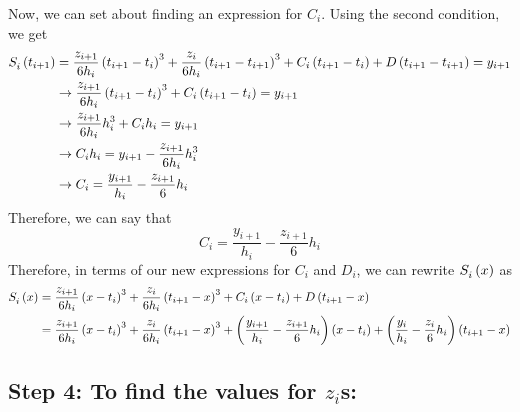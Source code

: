 \documentclass[letterpaper, 10pt, titlepage]{article}
\newcommand{\pp}{\paren}
\newcommand{\primed}[1]{^{
    \ifthenelse
    {
        \equal{#1}{0}
    }
    {
    }
    {
        \foreach \x in {1,...,#1}{\prime}}
    }
}
\newcommand{\fs}[3]{\functionof{S_{#1}\primed{#2}}{#3}}
\begin{document}
Now, we can set about finding an expression for $C_i$. Using the second
condition, we get
\begin{equation}
    \begin{aligned}
        \fs{i}{0}{t_{i+1}}
        &=
        \dfrac{z_{i+1}}{6h_i}\pp{t_{i+1} - t_i}^3
        + \dfrac{z_{i}}{6h_i}\pp{t_{i+1} - t_{i+1}}^3 + C_i\pp{t_{i+1} - t_i}
        + D\pp{t_{i+1} - t_{i+1}} = y_{i+1}
        \\
        &\rightarrow
        \dfrac{z_{i+1}}{6h_i}\pp{t_{i+1} - t_{i}}^3 + C_i\pp{t_{i+1} - t_i}
        = y_{i+1}
        \\
        &\rightarrow
        \dfrac{z_{i+1}}{6h_i}h_i^3 + C_ih_i
        = y_{i+1}
        \\
        &\rightarrow
        C_ih_i
        = y_{i+1}
        - \dfrac{z_{i+1}}{6h_i}h_i^3
        \\
        &\rightarrow
        C_i
        = \dfrac{y_{i+1}}{h_i}
        - \dfrac{z_{i+1}}{6}h_i
        \\
    \end{aligned}
\end{equation}
Therefore, we can say that
\begin{equation}
    \boxed{
        C_i
        =
        \dfrac{y_{i+1}}{h_i}
        - \dfrac{z_{i+1}}{6}h_i
    }
\end{equation}
Therefore, in terms of our new expressions for $C_i$ and $D_i$, we can rewrite
$\fs{i}{0}{x}$ as
\begin{equation}
    \begin{aligned}
        \fs{i}{0}{x}
        &=
        \dfrac{z_{i+1}}{6h_i}\pp{x - t_i}^3
        + \dfrac{z_{i}}{6h_i}\pp{t_{i+1} - x}^3 + C_i\pp{x - t_i} + D\pp{t_{i+1} - x}
        \\
        &=
        \dfrac{z_{i+1}}{6h_i}\pp{x - t_i}^3
        + \dfrac{z_{i}}{6h_i}\pp{t_{i+1} - x}^3
        + \pp{
            \dfrac{y_{i+1}}{h_i}
            - \dfrac{z_{i+1}}{6}h_i
            }\pp{x - t_i}
        + \pp{\dfrac{y_{i}}{h_i}
        - \dfrac{z_{i}}{6}h_i}\pp{t_{i+1} - x}
    \end{aligned}
\end{equation}




\subsection*{Step 4: To find the values for $z_i$s:}
\end{document}
